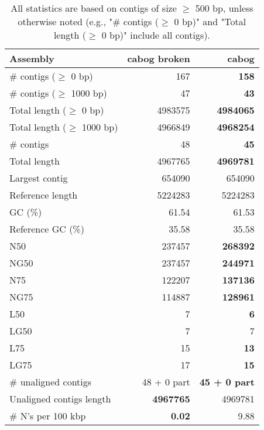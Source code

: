 \documentclass[12pt,a4paper]{article}
\begin{document}
\begin{table}[ht]
\begin{center}
\caption{All statistics are based on contigs of size $\geq$ 500 bp, unless otherwise noted (e.g., "\# contigs ($\geq$ 0 bp)" and "Total length ($\geq$ 0 bp)" include all contigs).}
\begin{tabular}{|l*{2}{|r}|}
\hline
Assembly & cabog broken & cabog \\ \hline
\# contigs ($\geq$ 0 bp) & 167 & {\bf 158} \\ \hline
\# contigs ($\geq$ 1000 bp) & 47 & {\bf 43} \\ \hline
Total length ($\geq$ 0 bp) & 4983575 & {\bf 4984065} \\ \hline
Total length ($\geq$ 1000 bp) & 4966849 & {\bf 4968254} \\ \hline
\# contigs & 48 & {\bf 45} \\ \hline
Total length & 4967765 & {\bf 4969781} \\ \hline
Largest contig & 654090 & 654090 \\ \hline
Reference length & 5224283 & 5224283 \\ \hline
GC (\%) & 61.54 & 61.53 \\ \hline
Reference GC (\%) & 35.58 & 35.58 \\ \hline
N50 & 237457 & {\bf 268392} \\ \hline
NG50 & 237457 & {\bf 244971} \\ \hline
N75 & 122207 & {\bf 137136} \\ \hline
NG75 & 114887 & {\bf 128961} \\ \hline
L50 & 7 & {\bf 6} \\ \hline
LG50 & 7 & 7 \\ \hline
L75 & 15 & {\bf 13} \\ \hline
LG75 & 17 & {\bf 15} \\ \hline
\# unaligned contigs & 48 + 0 part & {\bf 45 + 0 part} \\ \hline
Unaligned contigs length & {\bf 4967765} & 4969781 \\ \hline
\# N's per 100 kbp & {\bf 0.02} & 9.88 \\ \hline
\end{tabular}
\end{center}
\end{table}
\end{document}
